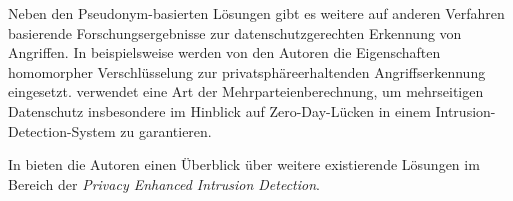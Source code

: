 
Neben den Pseudonym-basierten Lösungen gibt es weitere auf anderen Verfahren basierende Forschungsergebnisse zur datenschutzgerechten Erkennung von Angriffen. In \cite{park2007ppids} beispielsweise werden von den Autoren die Eigenschaften homomorpher Verschlüsselung zur privatsphäreerhaltenden Angriffserkennung eingesetzt. \cite{niksefat2013zids} verwendet eine Art der Mehrparteienberechnung, um mehrseitigen Datenschutz insbesondere im Hinblick auf Zero-Day-Lücken in einem Intrusion-Detection-System zu garantieren.

In \cite{niksefat2017privacy} bieten die Autoren einen Überblick über weitere existierende Lösungen im Bereich der \textit{Privacy Enhanced Intrusion Detection}.








\endinput

%
%








\todo{
Wo passen Abschnitte zu folgenden Stichworten hin?
- Verschiedene Datenarten: Identifizierend, Traffic, nicht relevant, ...
- Grundlegende Definition Insiderangriff
}

Liest man von erfolgreichen Angriffen auf Unternehmensnetzwerke, so ist die implizite Annahme von außenstehenden, unternehmensfremden Angreifern weit verbreitet. Doch häufig sind die Angreifer bereits im Netzwerk ansässig. Es handelt sich um (ehemalige) Mitarbeiter oder Personen mit legitimem Zugriff auf das Netzwerk, wie Geschäftspartnern oder Kunden. 

